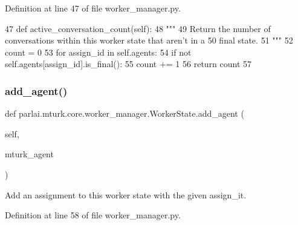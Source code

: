 Definition at line 47 of file worker\+\_\+manager.\+py.


\begin{DoxyCode}
47     \textcolor{keyword}{def }active\_conversation\_count(self):
48         \textcolor{stringliteral}{"""}
49 \textcolor{stringliteral}{        Return the number of conversations within this worker state that aren't in a}
50 \textcolor{stringliteral}{        final state.}
51 \textcolor{stringliteral}{        """}
52         count = 0
53         \textcolor{keywordflow}{for} assign\_id \textcolor{keywordflow}{in} self.agents:
54             \textcolor{keywordflow}{if} \textcolor{keywordflow}{not} self.agents[assign\_id].is\_final():
55                 count += 1
56         \textcolor{keywordflow}{return} count
57 
\end{DoxyCode}
\mbox{\label{classparlai_1_1mturk_1_1core_1_1worker__manager_1_1WorkerState_aa9680796261d0a48686474fb44741032}} 
\subsubsection{\texorpdfstring{add\+\_\+agent()}{add\_agent()}}
{\footnotesize\ttfamily def parlai.\+mturk.\+core.\+worker\+\_\+manager.\+Worker\+State.\+add\+\_\+agent (\begin{DoxyParamCaption}\item[{}]{self,  }\item[{}]{mturk\+\_\+agent }\end{DoxyParamCaption})}

\begin{DoxyVerb}Add an assignment to this worker state with the given assign_it.
\end{DoxyVerb}
 

Definition at line 58 of file worker\+\_\+manager.\+py.


